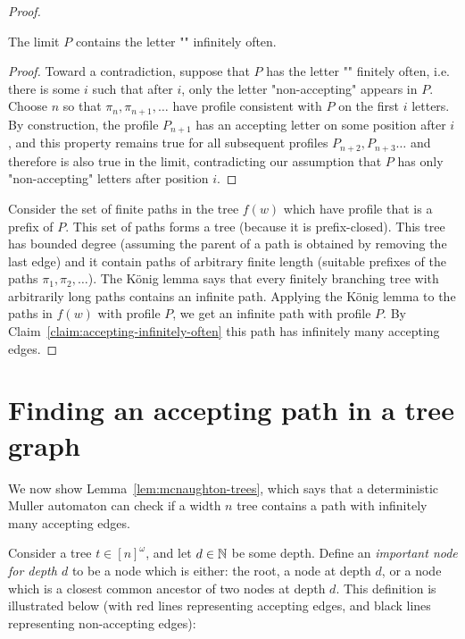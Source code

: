 \begin{proof}
\begin{claim}\label{claim:accepting-infinitely-often}
	The limit $P$ contains the letter "" infinitely often.
\end{claim}
\begin{proof}
Toward a contradiction, suppose that $P$ has the letter "" finitely often, i.e. there is some $i$ such that after $i$, only the letter  "non-accepting" appears in $P$. Choose $n$ so that $\pi_n,\pi_{n+1},\ldots$ have profile consistent with $P$ on the first $i$ letters. By construction, the profile $P_{n+1}$ has an accepting letter on some position after $i$, and this property remains true for all subsequent profiles $P_{n+2},P_{n+3}\ldots$ and therefore is also true in the limit, contradicting our assumption that $P$ has only "non-accepting" letters after position $i$.
\end{proof}

Consider the set of finite paths  in the tree $f(w)$ which have profile that is a prefix of $P$. This set of paths forms a tree (because it is prefix-closed). This tree has bounded degree (assuming the parent of a path is obtained by removing the last edge) and it contain paths of arbitrary finite length (suitable prefixes of the paths $\pi_1,\pi_2,\ldots$). The  König lemma says that every finitely branching tree with arbitrarily long paths contains an infinite path. Applying the König lemma to the paths in $f(w)$ with profile $P$, we get an infinite path with profile $P$. By Claim~\ref{claim:accepting-infinitely-often} this path has  infinitely many accepting edges. 
\end{proof}






\section{Finding an accepting path in a tree graph}
\label{sec:dag-graphs}
We now show Lemma~\ref{lem:mcnaughton-trees}, which says that a deterministic Muller automaton can check if a width $n$ tree contains a path with infinitely many accepting edges.

Consider a tree $t \in [n]^\omega$, and let $d \in \mathbb{N}$ be some depth. Define an  \emph{important node for depth $d$} to be a node which is either: the root, a node at depth $d$, or a node which is a closest common ancestor of two nodes at depth $d$. This definition is illustrated below (with red lines representing accepting edges, and black lines representing non-accepting edges):

